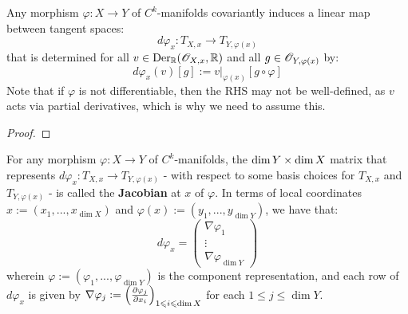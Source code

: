         \begin{corollary} \label{coro functoriality_of_tangent_spaces}
            Any morphism $\varphi: X \to Y$ of $C^k$-manifolds covariantly induces a linear map between tangent spaces:
                $$d\varphi_x: T_{X, x} \to T_{Y, \varphi(x)}$$
            that is determined for all $v \in \mathrm{Der}_{\mathbb{R}}(\mathscr{O}_{X, x}, \mathbb{R})$ and all $g \in \mathscr{O}_{Y, \varphi(x)}$ by:
                $$d\varphi_x( v )[g] := v|_{\varphi(x)}[g \circ \varphi]$$
            Note that if $\varphi$ is not differentiable, then the RHS may not be well-defined, as $v$ acts via partial derivatives, which is why we need to assume this. 
        \end{corollary}
            \begin{proof}
                
            \end{proof}
            
        \begin{definition}[Jacobians] \label{def: jacobian}
            For any morphism $\varphi: X \to Y$ of $C^k$-manifolds, the $\dim Y \x \dim X$ matrix that represents $d\varphi_x: T_{X, x} \to T_{Y, \varphi(x)}$ - with respect to some basis choices for $T_{X, x}$ and $T_{Y, \varphi(x)}$ - is called the \textbf{Jacobian} at $x$ of $\varphi$. In terms of local coordinates $x := (x_1, ..., x_{\dim X})$ and $\varphi(x) := (y_1, ..., y_{\dim Y})$, we have that:
                $$
                    d\varphi_x =
                    \begin{pmatrix}
                        \nabla \varphi_1
                        \\
                        \vdots
                        \\
                        \nabla \varphi_{\dim Y}
                    \end{pmatrix}
                $$
            wherein $\varphi := (\varphi_1, ..., \varphi_{\dim Y})$ is the component representation, and each row of $d\varphi_x$ is given by $\nabla \varphi_j := \left( \frac{\partial \varphi_j}{\partial x_i} \right)_{1 \leqslant i \leqslant \dim X}$ for each $1 \leq j \leq \dim Y$.
        \end{definition}

